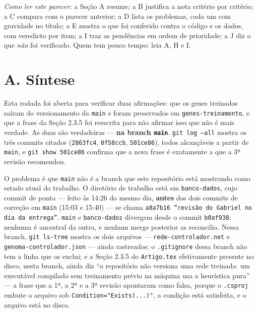 \documentclass[11pt,a4paper]{article}
\begin{document}
\vspace{0.8em}

\textit{Como ler este parecer:} a Seção A resume; a B justifica a nota critério por critério; a C
compara com o parecer anterior; a D lista os problemas, cada um com gravidade no título; a E mostra o
que foi conferido contra o código e os dados, com veredicto por item; a I traz as pendências em
ordem de prioridade; a J diz o que \emph{não} foi verificado. Quem tem pouco tempo: leia A, H e I.

\vspace{0.5em}

\section*{A. Síntese}

Esta rodada foi aberta para verificar duas afirmações: que os genes treinados saíram do
versionamento da \texttt{main} e foram preservados em \texttt{genes-treinamento}, e que a frase da
Seção 2.3.5 foi reescrita para não afirmar isso que não é mais verdade. As duas são verdadeiras ---
\textbf{na branch \texttt{main}}. \texttt{git log --all} mostra os três commits citados
(\texttt{2863fc4}, \texttt{0f58ccb}, \texttt{501ce86}), todos alcançáveis a partir de \texttt{main},
e \texttt{git show 501ce86} confirma que a nova frase é exatamente a que a 3ª revisão recomendou.

O problema é que \texttt{main} não é a branch que este repositório está mostrando como estado atual
do trabalho. O diretório de trabalho está em \texttt{banco-dados}, cujo commit de ponta --- feito às
14:26 do mesmo dia, \textbf{antes} dos dois commits de correção em \texttt{main} (15:03 e 15:40) --- se
chama \texttt{a8a7b16 ``revisão do Gabriel no dia da entrega''}. \texttt{main} e \texttt{banco-dados}
divergem desde o commit \texttt{b0af938}: nenhuma é ancestral da outra, e nenhum merge posterior as
reconcilia. Nessa branch, \texttt{git ls-tree} mostra os dois arquivos --- \texttt{rede-controlador.net}
e \texttt{genoma-controlador.json} --- ainda rastreados; o \texttt{.gitignore} dessa branch não tem a
linha que os exclui; e a Seção 2.3.5 do \texttt{Artigo.tex} efetivamente presente no disco, nesta
branch, ainda diz ``o repositório não versiona uma rede treinada: um executável compilado sem
treinamento prévio na máquina usa a heurística pura'' --- a frase que a 1ª, a 2ª e a 3ª revisão
apontaram como falsa, porque o \texttt{.csproj} embute o arquivo sob
\texttt{Condition="Exists(...)"}, a condição está satisfeita, e o arquivo está no disco.
\end{document}
